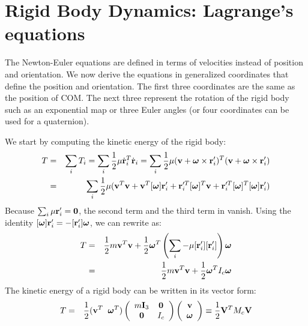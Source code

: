 \section{Rigid Body Dynamics: Lagrange's equations}
\label{sec:rigidbodydyngen}
The Newton-Euler equations are defined in terms of velocities instead of position and orientation. We now derive the equations in generalized coordinates  that define the position and orientation. The first three coordinates are the same as the position of COM. The next three represent the rotation of the rigid body such as an exponential map or three Euler angles (or four coordinates can be used for a quaternion).

We start by computing the kinetic energy of the rigid body:
\begin{eqnarray}
\label{eq:rigid_kinetic}
T &=& \sum_i T_i = \sum_i \frac{1}{2}  \mathbf{\mu} \dot{\mathbf{r}}_i^{T}
    \dot{\mathbf{r}}_i = \sum_i \frac{1}{2}  \mathbf{\mu} (\mathbf{v} + \bm{\omega}
    \times \mathbf{r}_i')^T (\mathbf{v} + \boldsymbol{\bm{\omega}}
    \times \mathbf{r}_i') \nonumber \\
 &=& \sum_i \frac{1}{2}  \mathbf{\mu} (\mathbf{v}^T\mathbf{v} +
    \mathbf{v}^T [\bm{\omega}] \mathbf{r}_i' + \mathbf{r}_i'^T [\bm{\omega}]^T \mathbf{v} +
    \mathbf{r}_i'^T [\bm{\omega}]^T [\bm{\omega}] \mathbf{r}_i')
\end{eqnarray}
Because $\sum_i \mathbf{\mu}
\mathbf{r}_i' = \mathbf{0}$, the second term and the third term in  vanish. Using the identity $[\bm{\omega}]\mathbf{r}_i' =
-[\mathbf{r}_i']\bm{\omega}$, we can rewrite 
as:
\begin{eqnarray}
\nonumber
T & = & \frac{1}{2} m \mathbf{v}^T\mathbf{v} + \frac{1}{2} \bm{\omega}^T \left ( \sum_i -\mathbf{\mu}
 [\mathbf{r}_i'][\mathbf{r}_i'] \right ) \bm{\omega}\\
 & = & \frac{1}{2} m \mathbf{v}^T\mathbf{v} + \frac{1}{2} \bm{\omega}^T I_c \bm{\omega}
\end{eqnarray}
The kinetic energy of a rigid body can be written in its vector form:
\begin{eqnarray}
\label{eq:kinetic_vec}
T &=& \frac{1}{2} (\mathbf{v}^T \;\; \bm{\omega}^T)
\left(
\begin{array}{cc}
m\mathbf{I}_3 & \mathbf{0} \\
\mathbf{0} & I_c
\end{array}
\right)
\left(
\begin{array}{c}
\mathbf{v} \\
\bm{\omega} 
\end{array}
\right)
 \equiv \frac{1}{2}\mathbf{V}^T M_c \mathbf{V}
\end{eqnarray}
